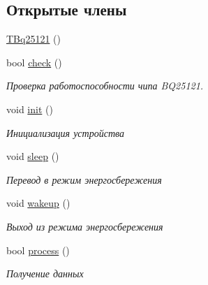 \subsection*{Открытые члены}
\begin{DoxyCompactItemize}
\item 
\hyperlink{classunit_1_1_t_bq25121_ae620c44c80792004e5ed25182964d419}{T\+Bq25121} ()
\item 
\mbox{\label{classunit_1_1_t_bq25121_a0971e07af4532b7cc33517cb72d1279b}} 
bool \hyperlink{classunit_1_1_t_bq25121_a0971e07af4532b7cc33517cb72d1279b}{check} ()
\begin{DoxyCompactList}\small\item\em Проверка работоспособности чипа B\+Q25121. \end{DoxyCompactList}\item 
\mbox{\label{classunit_1_1_t_bq25121_a195490b2493631c50f5f7380436c24be}} 
void \hyperlink{classunit_1_1_t_bq25121_a195490b2493631c50f5f7380436c24be}{init} ()
\begin{DoxyCompactList}\small\item\em Инициализация устройства \end{DoxyCompactList}\item 
\mbox{\label{classunit_1_1_t_bq25121_a769c16732c917f24c1b36292f13df415}} 
void \hyperlink{classunit_1_1_t_bq25121_a769c16732c917f24c1b36292f13df415}{sleep} ()
\begin{DoxyCompactList}\small\item\em Перевод в режим энергосбережения \end{DoxyCompactList}\item 
\mbox{\label{classunit_1_1_t_bq25121_a37ee8c808bce005ac349c0ea4ee9cf32}} 
void \hyperlink{classunit_1_1_t_bq25121_a37ee8c808bce005ac349c0ea4ee9cf32}{wakeup} ()
\begin{DoxyCompactList}\small\item\em Выход из режима энергосбережения \end{DoxyCompactList}\item 
\mbox{\label{classunit_1_1_t_bq25121_aef9b6fa9ec1e989523fa1584cb604a7d}} 
bool \hyperlink{classunit_1_1_t_bq25121_aef9b6fa9ec1e989523fa1584cb604a7d}{process} ()
\begin{DoxyCompactList}\small\item\em Получение данных \end{DoxyCompactList}\end{DoxyCompactItemize}


